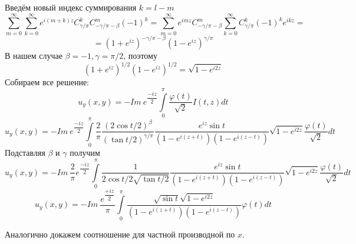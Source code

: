 \documentclass[12pt, a4paper]{article}
\begin{document}
	Введём новый индекс суммирования $k = l -m$
	\begin{equation*}
		\sum\limits_{m=0}^{\infty} \sum\limits_{k=0}^{\infty} e^{i(m+k)z} C^{k}_{\gamma/\pi} C^{m}_{-\gamma/\pi - \beta} (-1)^{k} = \sum\limits_{m=0}^{\infty} e^{imz} C^{m}_{-\gamma/\pi - \beta} \sum\limits_{k=0}^{\infty}  C^{k}_{\gamma/\pi} (-1)^k e^{ikz} = 
	\end{equation*}
	\begin{equation*}
		= (1 + e^{iz})^{-\gamma/\pi - \beta} (1- e^{iz})^{\gamma/\pi} 
	\end{equation*}
	В нашем случае $\beta = -1, \gamma = \pi/2$, поэтому
	\begin{equation*}
		(1 + e^{iz})^{1/2} (1- e^{iz})^{1/2} =\sqrt{1 - e^{i2z}} 
	\end{equation*}
	Собираем все решение:
	\begin{equation*}
		u_y(x,y) = - Im\ e^{\dfrac{-iz}{2}} \int\limits_0^\pi \dfrac{\varphi(t)}{\sqrt2} I(t,z) dt 
	\end{equation*}
	\begin{equation*}
		u_y(x,y) = - Im\ e^{\dfrac{-iz}{2}} \int\limits_0^\pi \dfrac{2}{\pi}\dfrac{(2\cos{t/2})^\beta}{(\tan{t/2})^{\gamma/\pi}}  \dfrac{e^{iz} \sin{t}}{\left(1 - e^{i(z+t)} \right) \left(1 - e^{i(z-t)}\right)} \sqrt{1 - e^{i2z}} \dfrac{\varphi(t)}{\sqrt2} dt
	\end{equation*}
	Подставляя $\beta$ и $\gamma$ получим
	\begin{equation*}
		u_y(x,y) = - Im\  \dfrac{2}{\pi} e^{\dfrac{-iz}{2}} \int\limits_0^\pi \dfrac{1}{2\cos{t/2} \sqrt{\tan{t/2}}}  \dfrac{e^{iz} \sin{t}}{\left(1 - e^{i(z+t)} \right) \left(1 - e^{i(z-t)}\right)} \sqrt{1 - e^{i2z}} \dfrac{\varphi(t)}{\sqrt2} dt
	\end{equation*}
	\begin{equation*}
		u_y(x,y) = - Im\  \dfrac{e^{\dfrac{+iz}{2}}}{\pi}  \int\limits_0^\pi  \dfrac{\sqrt{\sin{t}} \sqrt{1 - e^{i2z}}}{\left(1 - e^{i(z+t)} \right) \left(1 - e^{i(z-t)}\right)}  \varphi(t) dt
	\end{equation*}
	
	Аналогично докажем соотношение для частной производной по $x$.
	
\end{document}
